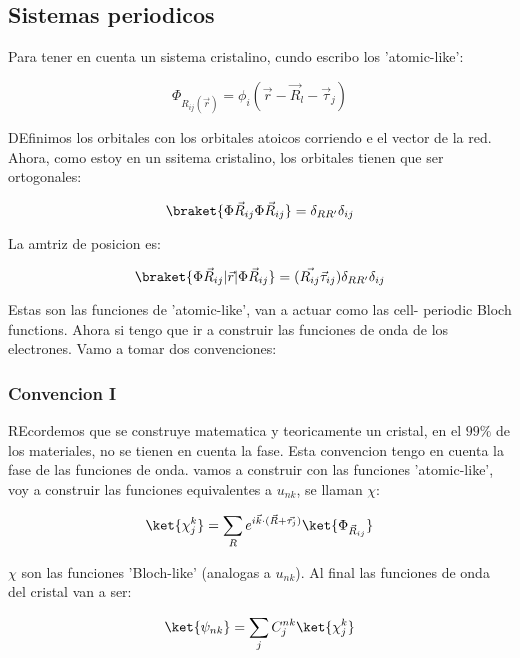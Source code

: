 \documentclass[11pt,fleqn]{book}
\begin{document}
\subsection{Sistemas periodicos}

Para tener en cuenta un sistema cristalino, cundo escribo los 'atomic-like':

\begin{equation}
    \Phi_{R_{ij}(\vec{r})}=\phi_{i}(\vec{r}-\vec{R}_{l}-\vec{\tau}_{j})
\end{equation}

DEfinimos los orbitales con los orbitales atoicos corriendo e el vector de la red. Ahora, como estoy en un ssitema cristalino, los orbitales tienen que ser ortogonales:

\begin{equation}
    \braket{\Phi\vec{R}_{ij}\Phi\vec{R}_{ij}}=\delta_{RR'}\delta_{ij}
\end{equation}

La amtriz de posicion es:

\begin{equation}
    \braket{\Phi\vec{R}_{ij}|\vec{r}|\Phi\vec{R}_{ij}}=(\vec{R_{ij}}\vec{\tau}_{ij})\delta_{RR'}\delta_{ij}  
\end{equation}

Estas son las funciones de 'atomic-like', van a actuar como las cell- periodic Bloch functions. Ahora si tengo que ir a construir las funciones de onda de los electrones. Vamo a tomar dos convenciones:

\subsubsection{Convencion I}

REcordemos que se construye matematica y teoricamente un cristal, en el $99\%$ de los materiales, no se tienen en cuenta la fase. Esta convencion tengo en cuenta la fase de las funciones de onda. vamos a construir con las funciones 'atomic-like', voy a construir las funciones equivalentes a $u_{nk}$, se llaman  $\chi$:

\begin{equation}
    \ket{\chi_{j}^{k}}=\sum_{R}e^{i\vec{k}\cdot(\vec{R}+\vec{\tau_{j}})}\ket{\Phi_{\vec{R}_{ij}}}
\end{equation}

$\chi$ son las funciones 'Bloch-like' (analogas a $u_{nk}$). Al final las funciones de onda del cristal van a ser:

\begin{equation}
    \ket{\psi_{nk}}=\sum_{j}C_{j}^{nk}\ket{\chi_{j}^{k}}
\end{equation}
\end{document}
